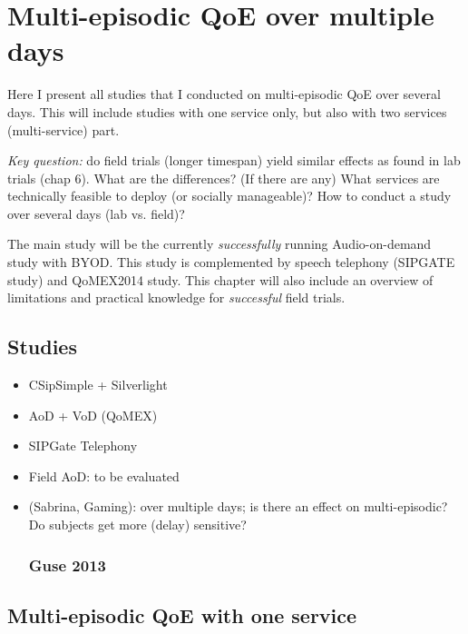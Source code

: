 \chapter{Multi-episodic QoE over multiple days}\label{chap:field}
\begin{chapter-abstract}
Here I present all studies that I conducted on multi-episodic QoE over several days.
This will include studies with one service only, but also with two services (multi-service) part.

\textit{Key question:} do field trials (longer timespan) yield similar effects as found in lab trials (chap 6).
What are the differences? (If there are any)
What services are technically feasible to deploy (or socially manageable)?
How to conduct a study over several days (lab vs. field)?

The main study will be the currently \textit{successfully} running Audio-on-demand study with BYOD.
This study is complemented by speech telephony (SIPGATE study) and QoMEX2014 study.
This chapter will also include an overview of limitations and practical knowledge for \textit{successful} field trials.
\end{chapter-abstract}

\section{Studies}
\begin{itemize}
\item CSipSimple + Silverlight
\item AoD + VoD (QoMEX)
\item SIPGate Telephony
\item Field AoD: to be evaluated
\item (Sabrina, Gaming): over multiple days; is there an effect on multi-episodic? Do subjects get more (delay) sensitive?
\cite{guse_macro-temporal_2013} %
\subsection{Guse 2013}
\end{itemize}

\section{Multi-episodic QoE with one service}

